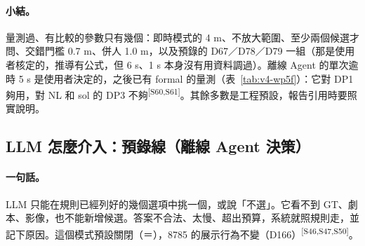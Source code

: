 \documentclass[11pt,a4paper]{article}
\newcommand{\src}[1]{\textsuperscript{\scriptsize[#1]}}
\newcommand{\code}[1]{\texttt{\detokenize{#1}}}
\begin{document}
\paragraph{小結。}量測過、有比較的參數只有幾個：即時模式的 4 m、不放大範圍、至少兩個候選才問、交錯門檻 0.7 m、併人 1.0 m，以及預錄的 D67／D78／D79 一組（那是使用者核定的，推導有公式，但 6 s、1 s 本身沒有用資料調過）。離線 Agent 的單次逾時 5 s 是使用者決定的，之後已有 formal 的量測（表~\ref{tab:v4-wp5f}）：它對 DP1 夠用，對 NL 和 sol 的 DP3 不夠\src{S60,S61}。其餘多數是工程預設，報告引用時要照實說明。

\subsection{LLM 怎麼介入：預錄線（離線 Agent 決策）}\label{sec:v4-llm-off}

\paragraph{一句話。}LLM 只能在規則已經列好的幾個選項中挑一個，或說「不選」。它看不到 GT、劇本、影像，也不能新增候選。答案不合法、太慢、超出預算，系統就照規則走，並記下原因。這個模式預設關閉（\code{mode}＝\code{OFF}），8785 的展示行為不變（D166）\src{S46,S47,S50}。
\end{document}
